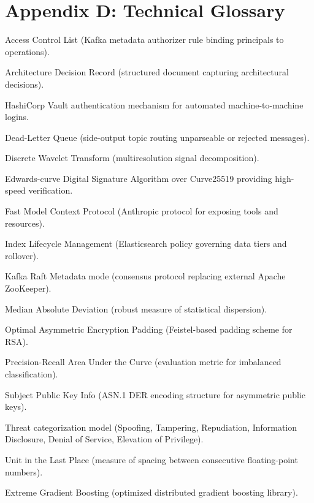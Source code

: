 \documentclass[10pt,a4paper]{report}
\begin{document}
\section{Appendix D: Technical Glossary}
\begin{description}[leftmargin=3.5cm,style=nextline]
  \item[ACL] Access Control List (Kafka metadata authorizer rule binding principals to operations).
  \item[ADR] Architecture Decision Record (structured document capturing architectural decisions).
  \item[AppRole] HashiCorp Vault authentication mechanism for automated machine-to-machine logins.
  \item[DLQ] Dead-Letter Queue (side-output topic routing unparseable or rejected messages).
  \item[DWT] Discrete Wavelet Transform (multiresolution signal decomposition).
  \item[Ed25519] Edwards-curve Digital Signature Algorithm over Curve25519 providing high-speed verification.
  \item[FastMCP] Fast Model Context Protocol (Anthropic protocol for exposing tools and resources).
  \item[ILM] Index Lifecycle Management (Elasticsearch policy governing data tiers and rollover).
  \item[KRaft] Kafka Raft Metadata mode (consensus protocol replacing external Apache ZooKeeper).
  \item[MAD] Median Absolute Deviation (robust measure of statistical dispersion).
  \item[OAEP] Optimal Asymmetric Encryption Padding (Feistel-based padding scheme for RSA).
  \item[PR-AUC] Precision-Recall Area Under the Curve (evaluation metric for imbalanced classification).
  \item[SPKI] Subject Public Key Info (ASN.1 DER encoding structure for asymmetric public keys).
  \item[STRIDE] Threat categorization model (Spoofing, Tampering, Repudiation, Information Disclosure, Denial of Service, Elevation of Privilege).
  \item[ULP] Unit in the Last Place (measure of spacing between consecutive floating-point numbers).
  \item[XGBoost] Extreme Gradient Boosting (optimized distributed gradient boosting library).
\end{description}
\end{document}
